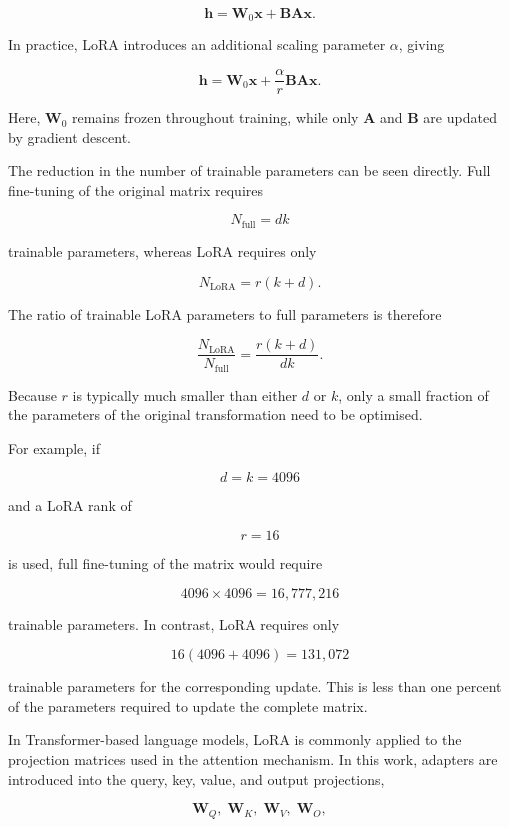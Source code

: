\documentclass[11pt,a4paper]{article}
\begin{document}
\[
    \mathbf{h}
    =
    \mathbf{W}_0\mathbf{x}
    +
    \mathbf{B}\mathbf{A}\mathbf{x}.
\]

In practice, LoRA introduces an additional scaling parameter $\alpha$, giving

\[
    \mathbf{h}
    =
    \mathbf{W}_0\mathbf{x}
    +
    \frac{\alpha}{r}
    \mathbf{B}\mathbf{A}\mathbf{x}.
\]

Here, $\mathbf{W}_0$ remains frozen throughout training, while only
$\mathbf{A}$ and $\mathbf{B}$ are updated by gradient descent.

The reduction in the number of trainable parameters can be seen directly.
Full fine-tuning of the original matrix requires

\[
    N_{\text{full}} = dk
\]

trainable parameters, whereas LoRA requires only

\[
    N_{\text{LoRA}}
    =
    r(k+d).
\]

The ratio of trainable LoRA parameters to full parameters is therefore

\[
    \frac{N_{\text{LoRA}}}{N_{\text{full}}}
    =
    \frac{r(k+d)}{dk}.
\]

Because $r$ is typically much smaller than either $d$ or $k$, only a small
fraction of the parameters of the original transformation need to be
optimised.

For example, if

\[
    d = k = 4096
\]

and a LoRA rank of

\[
    r = 16
\]

is used, full fine-tuning of the matrix would require

\[
    4096 \times 4096
    =
    16{,}777{,}216
\]

trainable parameters. In contrast, LoRA requires only

\[
    16(4096 + 4096)
    =
    131{,}072
\]

trainable parameters for the corresponding update. This is less than
one percent of the parameters required to update the complete matrix.

In Transformer-based language models, LoRA is commonly applied to the
projection matrices used in the attention mechanism. In this work, adapters
are introduced into the query, key, value, and output projections,

\[
    \mathbf{W}_{Q},\;
    \mathbf{W}_{K},\;
    \mathbf{W}_{V},\;
    \mathbf{W}_{O},
\]
\end{document}
